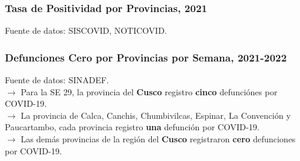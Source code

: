 \documentclass[xcolor=table]{beamer}
\begin{document}
	\begin{frame}
		\frametitle{Tasa de Positividad por Provincias, 2021}
		\vspace{-.5cm}
		
		\begin{table}[]
			\resizebox{\textwidth}{!}{%
				
			}
		\end{table}	
		{\tiny Fuente de datos: SISCOVID, NOTICOVID.}
		
	\end{frame}
	
	\begin{frame}
		\frametitle{Defunciones Cero por Provincias por Semana, 2021-2022}
		\vspace{-.5cm}
		
		\begin{table}[]
			\resizebox{\textwidth}{!}{%
				
			}
		\end{table}	
		{\tiny Fuente de datos: SINADEF. \\}
		\vspace{0.5cm}
		$\rightarrow$ Para la SE 29, la provincia del \textbf{\color{mycolor5}Cusco} registro \textbf{\color{mycolor5}cinco} defunciónes por COVID-19.\\
		$\rightarrow$ La provincia de Calca, Canchis, Chumbivilcas, Espinar, La Convención y Paucartambo, cada provincia registro \textbf{\color{mycolor5}una} defunción por COVID-19.\\
		$\rightarrow$ Las demás provincias de la región del \textbf{\color{mycolor5}Cusco} registraron \textbf{\color{mycolor5}cero} defunciones por COVID-19.
	\end{frame}
	
\end{document}
